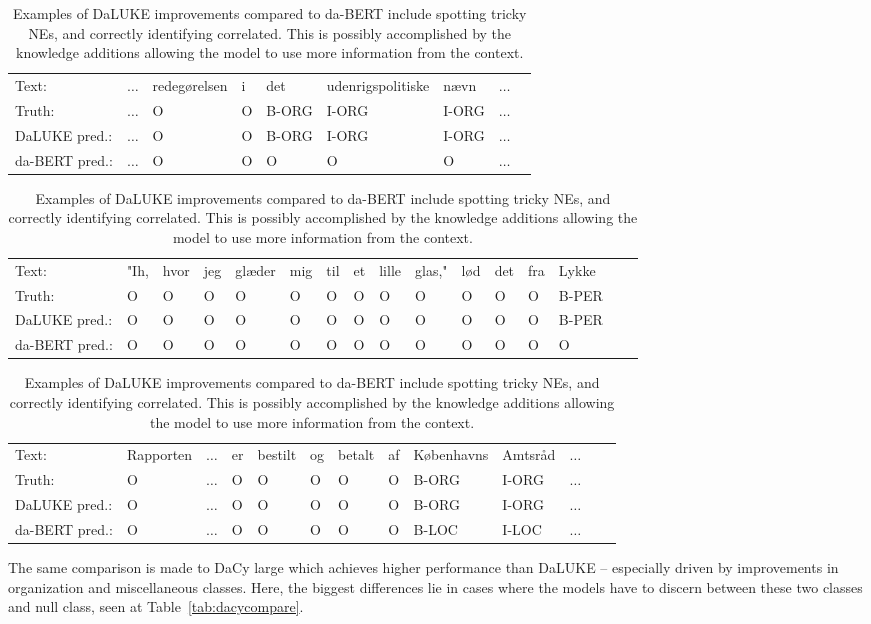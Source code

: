 \documentclass[main.tex]{subfiles}
\begin{document}
\begin{table}[H]
    \footnotesize
    \begin{tabular}{l|llllllll}
        Text:             & $\ldots$  & redegørelsen  & i  & det    & udenrigspolitiske  & nævn   & $\ldots$ \\
        Truth:            & $\ldots$  & O             & O  & B-ORG  & I-ORG              & I-ORG  & $\ldots$ \\\hline
        DaLUKE pred.:     & $\ldots$  & O             & O  & B-ORG  & I-ORG              & I-ORG  & $\ldots$ \\
        da-BERT pred.:    & $\ldots$  & O             & O  & O      & O                  & O      & $\ldots$ \\
    \end{tabular}\par
    \begin{tabular}{l|lllllllllllllll}
        Text:            &  "Ih,   & hvor  & jeg  & glæder  & mig  & til  & et  & lille  & glas,"  & lød  & det  & fra  & Lykke  \\
        Truth:           &  O    & O     & O    & O       & O    & O    & O   & O      & O        & O    & O    & O    & B-PER  \\\hline
        DaLUKE pred.:    &  O    & O     & O    & O       & O    & O    & O   & O      & O        & O    & O    & O    & B-PER  \\
        da-BERT pred.:   &  O    & O     & O    & O       & O    & O    & O   & O      & O        & O    & O    & O    & O
    \end{tabular}\par
    \begin{tabular}{l|llllllllllll}
        Text:            & Rapporten  & $\ldots$  & er  & bestilt  & og  & betalt  & af  & Københavns  & Amtsråd  & $\ldots$\\
        Truth:           & O          & $\ldots$  & O   & O        & O   & O       & O   & B-ORG       & I-ORG    & $\ldots$\\\hline
        DaLUKE  pred.:   & O          & $\ldots$  & O   & O        & O   & O       & O   & B-ORG       & I-ORG    & $\ldots$\\
        da-BERT pred.:   & O          & $\ldots$  & O   & O        & O   & O       & O   & B-LOC       & I-LOC    & $\ldots$
    \end{tabular}
    \caption{
        Examples of DaLUKE improvements compared to da-BERT include spotting tricky NEs, and correctly identifying correlated.
        This is possibly accomplished by the knowledge additions allowing the model to use more information from the context.
    }
    \label{tab:daberterrors}
\end{table}\noindent
The same comparison is made to DaCy large which achieves higher performance than DaLUKE -- especially driven by improvements in organization and miscellaneous classes.
Here, the biggest differences lie in cases where the models have to discern between these two classes and  null class, seen at Table~\ref{tab:dacycompare}.
\end{document}
